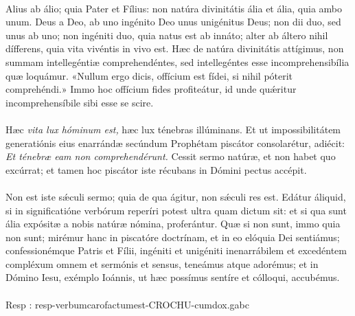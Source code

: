 \documentclass[options]{article}
\begin{document}
\\
Alius ab álio; quia Pater et Fílius: non natúra divinitátis ália et ália, quia ambo unum. Deus a Deo, ab uno ingénito Deo unus unigénitus Deus; non dii duo, sed unus ab uno; non ingéniti duo, quia natus est ab innáto; alter ab áltero nihil dífferens, quia vita vivéntis in vivo est. Hæc de natúra divinitátis attígimus, non summam intellegéntiæ comprehendéntes, sed intellegéntes esse incomprehensibília quæ loquámur. «Nullum ergo dicis, offícium est fídei, si nihil póterit comprehéndi.» Immo hoc offícium fides profiteátur, id unde qu\'{æ}ritur incomprehensíbile sibi esse se scire.\\
\\
Hæc \emph{vita lux hóminum est,} hæc lux ténebras illúminans. Et ut impossibilitátem generatiónis eius enarrándæ secúndum Prophétam piscátor consolarétur, adiécit: \emph{Et ténebræ eam non comprehendérunt.} Cessit sermo natúræ, et non habet quo excúrrat; et tamen hoc piscátor iste récubans in Dómini pectus accépit.\\
\\
Non est iste s\'{æ}culi sermo; quia de qua ágitur, non s\'{æ}culi res est. Edátur áliquid, si in significatióne verbórum reperíri potest ultra quam dictum sit: et si qua sunt ália expósitæ a nobis natúræ nómina, proferántur. Quæ si non sunt, immo quia non sunt; mirémur hanc in piscatóre doctrínam, et in eo elóquia Dei sentiámus; confessionémque Patris et Fílii, ingéniti et unigéniti inenarrábilem et excedéntem compléxum omnem et sermónis et sensus, teneámus atque adorémus; et in Dómino Iesu, exémplo Ioánnis, ut hæc possímus sentíre et cólloqui, accubémus.\\
\\	
	Resp : resp-verbumcarofactumest-CROCHU-cumdox.gabc
\end{document}
